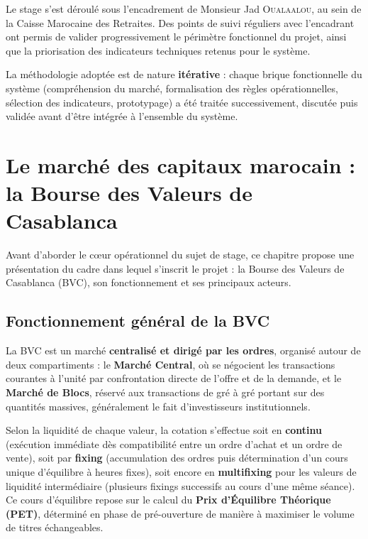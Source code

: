 \documentclass{rapportENSIAS} %
\begin{document}
\noindent
Le stage s'est déroulé sous l'encadrement de Monsieur Jad \textsc{Oualaalou}, au sein de la Caisse Marocaine des Retraites. Des points de suivi réguliers avec l'encadrant ont permis de valider progressivement le périmètre fonctionnel du projet, ainsi que la priorisation des indicateurs techniques retenus pour le système.

\vspace{0.3cm}
\noindent
La méthodologie adoptée est de nature \textbf{itérative} : chaque brique fonctionnelle du système (compréhension du marché, formalisation des règles opérationnelles, sélection des indicateurs, prototypage) a été traitée successivement, discutée puis validée avant d'être intégrée à l'ensemble du système.


\chapter{Le marché des capitaux marocain : la Bourse des Valeurs de Casablanca}

\noindent
Avant d'aborder le c\oe ur opérationnel du sujet de stage, ce chapitre propose une présentation du cadre dans lequel s'inscrit le projet : la Bourse des Valeurs de Casablanca (BVC), son fonctionnement et ses principaux acteurs.

\section{Fonctionnement général de la BVC}

\noindent
La BVC est un marché \textbf{centralisé et dirigé par les ordres}, organisé autour de deux compartiments : le \textbf{Marché Central}, où se négocient les transactions courantes à l'unité par confrontation directe de l'offre et de la demande, et le \textbf{Marché de Blocs}, réservé aux transactions de gré à gré portant sur des quantités massives, généralement le fait d'investisseurs institutionnels.

\vspace{0.3cm}
\noindent
Selon la liquidité de chaque valeur, la cotation s'effectue soit en \textbf{continu} (exécution immédiate dès compatibilité entre un ordre d'achat et un ordre de vente), soit par \textbf{fixing} (accumulation des ordres puis détermination d'un cours unique d'équilibre à heures fixes), soit encore en \textbf{multifixing} pour les valeurs de liquidité intermédiaire (plusieurs fixings successifs au cours d'une même séance). Ce cours d'équilibre repose sur le calcul du \textbf{Prix d'Équilibre Théorique (PET)}, déterminé en phase de pré-ouverture de manière à maximiser le volume de titres échangeables.
\end{document}
